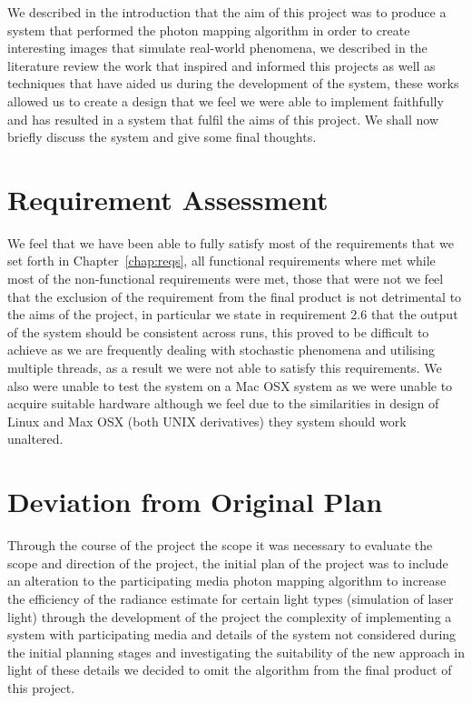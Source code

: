 We described in the introduction that the aim of this project was to produce a system that performed the photon mapping algorithm
in order to create interesting images that simulate real-world phenomena, we described in the literature review the work that
inspired and informed this projects as well as techniques that have aided us during the development of the system, these works
allowed us to create a design that we feel we were able to implement faithfully and has resulted in a system that fulfil the
aims of this project. We shall now briefly discuss the system and give some final thoughts.

\section{Requirement Assessment}
We feel that we have been able to fully satisfy most of the requirements that we set forth in Chapter~\ref{chap:reqs}, all
functional requirements where met while most of the non-functional requirements were met, those that were not we feel
that the exclusion of the requirement from the final product is not detrimental to the aims of the project, in particular
we state in requirement 2.6 that the output of the system should be consistent across runs, this proved to be difficult to
achieve as we are frequently dealing with stochastic phenomena and utilising multiple threads, as a result we were not
able to satisfy this requirements. We also were unable to test the system on a Mac OSX system as we were unable to acquire
suitable hardware although we feel due to the similarities in design of Linux and Max OSX (both UNIX derivatives) they system
should work unaltered.

\section{Deviation from Original Plan}
Through the course of the project the scope it was necessary to evaluate the scope and direction of the project, the initial plan
of the project was to include an alteration to the participating media photon mapping algorithm to increase the efficiency of the
radiance estimate for certain light types (simulation of laser light) through the development of the project the complexity of
implementing a system with participating media and details of the system not considered during the initial planning stages and
investigating the suitability of the new approach in light of these details we decided to omit the algorithm from the final product
of this project.

